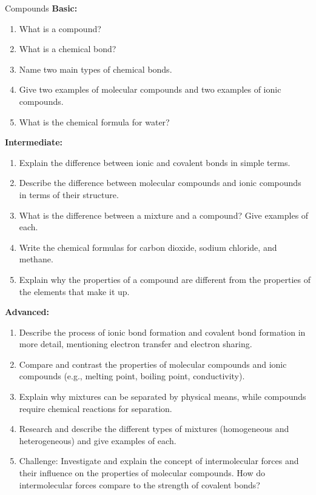 \begin{tieredquestions}{Compounds}
\textbf{Basic:}
\begin{enumerate}
    \item What is a compound?
    \item What is a chemical bond?
    \item Name two main types of chemical bonds.
    \item Give two examples of molecular compounds and two examples of ionic compounds.
    \item What is the chemical formula for water?
\end{enumerate}

\textbf{Intermediate:}
\begin{enumerate}
    \item Explain the difference between ionic and covalent bonds in simple terms.
    \item Describe the difference between molecular compounds and ionic compounds in terms of their structure.
    \item What is the difference between a mixture and a compound? Give examples of each.
    \item Write the chemical formulas for carbon dioxide, sodium chloride, and methane.
    \item Explain why the properties of a compound are different from the properties of the elements that make it up.
\end{enumerate}

\textbf{Advanced:}
\begin{enumerate}
    \item Describe the process of ionic bond formation and covalent bond formation in more detail, mentioning electron transfer and electron sharing.
    \item Compare and contrast the properties of molecular compounds and ionic compounds (e.g., melting point, boiling point, conductivity).
    \item Explain why mixtures can be separated by physical means, while compounds require chemical reactions for separation.
    \item Research and describe the different types of mixtures (homogeneous and heterogeneous) and give examples of each.
    \item Challenge: Investigate and explain the concept of intermolecular forces and their influence on the properties of molecular compounds. How do intermolecular forces compare to the strength of covalent bonds?
\end{enumerate}
\end{tieredquestions}


